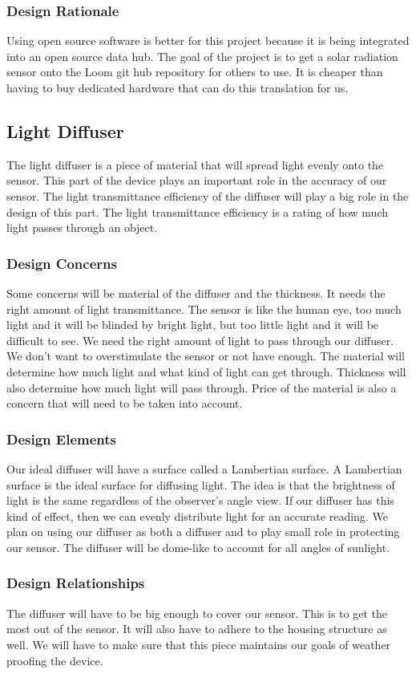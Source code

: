 \documentclass[10pt,draftclsnofoot,onecolumn,letterpaper]{article}
\begin{document}
\subsubsection{Design Rationale}
Using open source software is better for this project because it is being integrated into an open source data hub. The goal of the project is to get a solar radiation sensor onto the Loom git hub repository for others to use. It is cheaper than having to buy dedicated hardware that can do this translation for us. 

\subsection{Light Diffuser}
The light diffuser is a piece of material that will spread light evenly onto the sensor. This part of the device plays an important role in the accuracy of our sensor. The light transmittance efficiency of the diffuser will play a big role in the design of this part. The light transmittance efficiency is a rating of how much light passes through an object.
\subsubsection{Design Concerns}
Some concerns will be material of the diffuser and the thickness. It needs the right amount of light transmittance.  The sensor is like the human eye, too much light and it will be blinded by bright light, but too little light and it will be difficult to see. We need the right amount of light to pass through our diffuser. We don't want to overstimulate the sensor or not have enough. The material will determine how much light and what kind of light can get through. Thickness will also determine how much light will pass through. Price of the material is also a concern that will need to be taken into account.
\subsubsection{Design Elements}
Our ideal diffuser will have a surface called a Lambertian surface. A Lambertian surface is the ideal surface for diffusing light. The idea is that the brightness of light is the same regardless of the observer's angle view. If our diffuser has this kind of effect, then we can evenly distribute light for an accurate reading. We plan on using our diffuser as both a diffuser and to play small role in protecting our sensor. The diffuser will be dome-like to account for all angles of sunlight.
\subsubsection{Design Relationships}
The diffuser will have to be big enough to cover our sensor. This is to get the most out of the sensor. It will also have to adhere to the housing structure as well. We will have to make sure that this piece maintains our goals of weather proofing the device.
\end{document}
